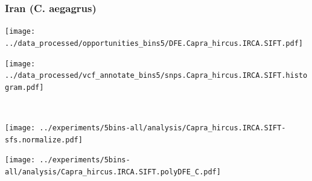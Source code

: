 \subsubsection{Iran (C. aegagrus)}

\begin{minipage}{0.49\linewidth}
    \texttt{[image: ../data\_processed/opportunities\_bins5/DFE.Capra\_hircus.IRCA.SIFT.pdf]}
\end{minipage}
\begin{minipage}{0.49\linewidth}
    \texttt{[image: ../data\_processed/vcf\_annotate\_bins5/snps.Capra\_hircus.IRCA.SIFT.histogram.pdf]}
\end{minipage}
\\
\begin{minipage}{0.49\linewidth}
    \texttt{[image: ../experiments/5bins-all/analysis/Capra\_hircus.IRCA.SIFT-sfs.normalize.pdf]}
\end{minipage}
\begin{minipage}{0.4\linewidth}
    \texttt{[image: ../experiments/5bins-all/analysis/Capra\_hircus.IRCA.SIFT.polyDFE\_C.pdf]}
\end{minipage}
